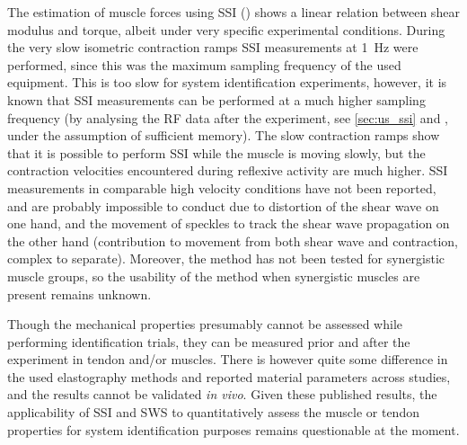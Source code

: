 The estimation of muscle forces using SSI (\citet{bouillard_estimation_2011}) shows a linear relation between shear modulus and torque, albeit under very specific experimental conditions. During the very slow isometric contraction ramps SSI measurements at \SI{1}{\hertz} were performed, since this was the maximum sampling frequency of the used equipment. This is too slow for system identification experiments, however, it is known that SSI measurements can be performed at a much higher sampling frequency (by analysing the RF data after the experiment, see \autoref{sec:us_ssi} and \cite{bercoff_supersonic_2004}, under the assumption of sufficient memory). The slow contraction ramps show that it is possible to perform SSI while the muscle is moving slowly, but the contraction velocities encountered during reflexive activity are much higher. SSI measurements in comparable high velocity conditions have not been reported, and are probably impossible to conduct due to distortion of the shear wave on one hand, and the movement of speckles to track the shear wave propagation on the other hand (contribution to movement from both shear wave and contraction, complex to separate). Moreover, the method has not been tested for synergistic muscle groups, so the usability of the method when synergistic muscles are present remains unknown. 


Though the mechanical properties presumably cannot be assessed while performing identification trials, they can be measured prior and after the experiment in tendon and/or muscles. There is however quite some difference in the used elastography methods and reported material parameters across studies, and the results cannot be validated \textit{in vivo}. Given these published results, the applicability of SSI and SWS to quantitatively assess the muscle or tendon properties for system identification purposes remains questionable at the moment. 

